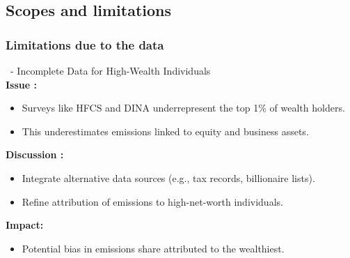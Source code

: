 \documentclass[10pt]{beamer}
\begin{document}
\subsection{Scopes and limitations}

\subsubsection{Limitations due to the data}

\begin{frame}{\subsecname \  - \subsubsecname}
    Incomplete Data for High-Wealth Individuals \\ 
    \textbf{Issue :}
    \begin{itemize}
        \item Surveys like HFCS and DINA underrepresent the top 1\% of wealth holders.
        \item This underestimates emissions linked to equity and business assets.
    \end{itemize}
    \vspace{0.3cm}
    \textbf{Discussion :}
    \begin{itemize}
        \item Integrate alternative data sources (e.g., tax records, billionaire lists).
        \item Refine attribution of emissions to high-net-worth individuals.
    \end{itemize}
    \vspace{0.3cm}
    \textbf{Impact:}
    \begin{itemize}
        \item Potential bias in emissions share attributed to the wealthiest.
    \end{itemize}
\end{frame}
\end{document}
